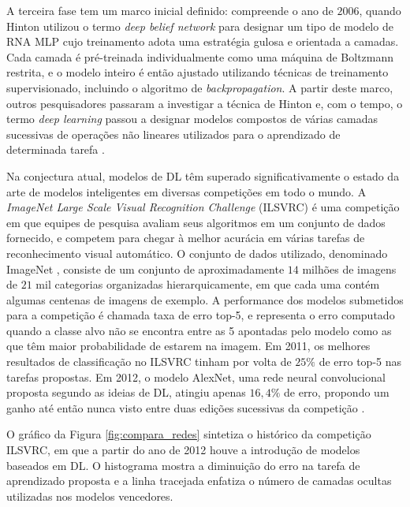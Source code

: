 A terceira fase tem um marco inicial definido: compreende o ano de $2006$, quando Hinton utilizou o termo \emph{deep belief network} para designar um tipo de modelo de RNA MLP cujo treinamento adota uma estratégia gulosa e orientada a camadas. Cada camada é pré-treinada individualmente como uma máquina de Boltzmann restrita, e o modelo inteiro é então ajustado utilizando técnicas de treinamento supervisionado, incluindo o algoritmo de \emph{backpropagation}. A partir deste marco, outros pesquisadores passaram a investigar a técnica de Hinton e, com o tempo, o termo \emph{deep learning} passou a designar modelos compostos de várias camadas sucessivas de operações não lineares utilizados para o aprendizado de determinada tarefa \cite{hinton2006fast, hinton2007learning, goodfellow2016deep, deng2014deep}.

Na conjectura atual, modelos de DL têm superado significativamente o estado da arte de modelos inteligentes em diversas competições em todo o mundo. A \emph{ImageNet Large Scale Visual Recognition Challenge} (ILSVRC) \cite{ImagenetChall} é uma competição em que equipes de pesquisa avaliam seus algoritmos em um conjunto de dados fornecido, e competem para chegar à melhor acurácia em várias tarefas de reconhecimento visual automático. O conjunto de dados utilizado, denominado ImageNet \cite{Imagenet:main}, consiste de um conjunto de aproximadamente $14$ milhões de imagens de $21$ mil categorias organizadas hierarquicamente, em que cada uma contém algumas centenas de imagens de exemplo. A performance dos modelos submetidos para a competição é chamada taxa de erro top-5, e representa o erro computado quando a classe alvo não se encontra entre as 5 apontadas pelo modelo como as que têm maior probabilidade de estarem na imagem. Em 2011, os melhores resultados de  classificação no ILSVRC tinham por volta de $25\%$ de erro top-5 nas tarefas propostas. Em 2012, o modelo AlexNet, uma rede neural convolucional proposta segundo as ideias de DL, atingiu apenas $16,4\%$ de erro, propondo um ganho até então nunca visto entre duas edições sucessivas da competição \cite{ImagenetChall:2012}.

O gráfico da Figura \ref{fig:compara_redes} sintetiza o histórico da competição ILSVRC, em que a partir do ano de 2012 houve a introdução de modelos baseados em DL. O histograma mostra a diminuição do erro na tarefa de aprendizado proposta e a linha tracejada enfatiza o número de camadas ocultas utilizadas nos modelos vencedores.

